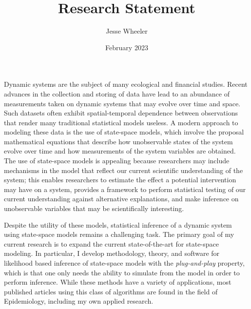 \documentclass{article}
\title{Research Statement}
\author{Jesse Wheeler}
\date{February 2023}
\begin{document}
\rule{0mm}{1mm}
\vspace{-20mm}


\vspace{1mm}

\rule{0mm}{1mm}

\vspace{3mm}
\rule{0mm}{1mm}

\vspace{4mm}

Dynamic systems are the subject of many ecological and financial studies. 
Recent advances in the collection and storing of data have lead to an abundance of measurements taken on dynamic systems that may evolve over time and space. 
Such datasets often exhibit spatial-temporal dependence between observations that render many traditional statistical models useless. 
A modern approach to modeling these data is the use of state-space models, which involve the proposal mathematical equations that describe how unobservable states of the system evolve over time and how measurements of the system variables are obtained. 
The use of state-space models is appealing because researchers may include mechanisms in the model that reflect our current scientific understanding of the system; 
this enables researchers to estimate the effect a potential intervention may have on a system, provides a framework to perform statistical testing of our current understanding against alternative explanations, and make inference on unobservable variables that may be scientifically interesting.

Despite the utility of these models, statistical inference of a dynamic system using state-space models remains a challenging task. 
The primary goal of my current research is to expand the current state-of-the-art for state-space modeling. In particular, I develop methodology, theory, and software for likelihood based inference of state-space models with the {\it plug-and-play} property, which is that one only needs the ability to simulate from the model in order to perform inference.
While these methods have a variety of applications, most published articles using this class of algorithms are found in the field of Epidemiology, including my own applied research. 
\end{document}
